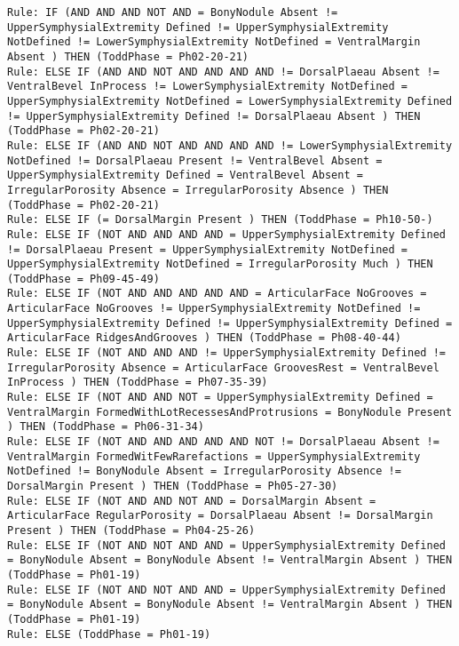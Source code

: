 \begin{lstlisting}
Rule: IF (AND AND AND NOT AND = BonyNodule Absent != UpperSymphysialExtremity Defined != UpperSymphysialExtremity NotDefined != LowerSymphysialExtremity NotDefined = VentralMargin Absent ) THEN (ToddPhase = Ph02-20-21)
Rule: ELSE IF (AND AND NOT AND AND AND AND != DorsalPlaeau Absent != VentralBevel InProcess != LowerSymphysialExtremity NotDefined = UpperSymphysialExtremity NotDefined = LowerSymphysialExtremity Defined != UpperSymphysialExtremity Defined != DorsalPlaeau Absent ) THEN (ToddPhase = Ph02-20-21)
Rule: ELSE IF (AND AND NOT AND AND AND AND != LowerSymphysialExtremity NotDefined != DorsalPlaeau Present != VentralBevel Absent = UpperSymphysialExtremity Defined = VentralBevel Absent = IrregularPorosity Absence = IrregularPorosity Absence ) THEN (ToddPhase = Ph02-20-21)
Rule: ELSE IF (= DorsalMargin Present ) THEN (ToddPhase = Ph10-50-)
Rule: ELSE IF (NOT AND AND AND AND = UpperSymphysialExtremity Defined != DorsalPlaeau Present = UpperSymphysialExtremity NotDefined = UpperSymphysialExtremity NotDefined = IrregularPorosity Much ) THEN (ToddPhase = Ph09-45-49)
Rule: ELSE IF (NOT AND AND AND AND AND = ArticularFace NoGrooves = ArticularFace NoGrooves != UpperSymphysialExtremity NotDefined != UpperSymphysialExtremity Defined != UpperSymphysialExtremity Defined = ArticularFace RidgesAndGrooves ) THEN (ToddPhase = Ph08-40-44)
Rule: ELSE IF (NOT AND AND AND != UpperSymphysialExtremity Defined != IrregularPorosity Absence = ArticularFace GroovesRest = VentralBevel InProcess ) THEN (ToddPhase = Ph07-35-39)
Rule: ELSE IF (NOT AND AND NOT = UpperSymphysialExtremity Defined = VentralMargin FormedWithLotRecessesAndProtrusions = BonyNodule Present ) THEN (ToddPhase = Ph06-31-34)
Rule: ELSE IF (NOT AND AND AND AND AND NOT != DorsalPlaeau Absent != VentralMargin FormedWitFewRarefactions = UpperSymphysialExtremity NotDefined != BonyNodule Absent = IrregularPorosity Absence != DorsalMargin Present ) THEN (ToddPhase = Ph05-27-30)
Rule: ELSE IF (NOT AND AND NOT AND = DorsalMargin Absent = ArticularFace RegularPorosity = DorsalPlaeau Absent != DorsalMargin Present ) THEN (ToddPhase = Ph04-25-26)
Rule: ELSE IF (NOT AND NOT AND AND = UpperSymphysialExtremity Defined = BonyNodule Absent = BonyNodule Absent != VentralMargin Absent ) THEN (ToddPhase = Ph01-19)
Rule: ELSE IF (NOT AND NOT AND AND = UpperSymphysialExtremity Defined = BonyNodule Absent = BonyNodule Absent != VentralMargin Absent ) THEN (ToddPhase = Ph01-19)
Rule: ELSE (ToddPhase = Ph01-19)
\end{lstlisting}



